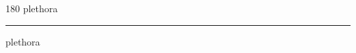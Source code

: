
\begin{frame}
\begin{center}
\begin{turn}{180}
{\fontsize{2.5cm}{1em}\selectfont plethora}
\end{turn}
\vspace{1em}\par  
\hrule
\vspace{1em}\par  
{\fontsize{2.5cm}{1em}\selectfont plethora}
\end{center}
\end{frame}
